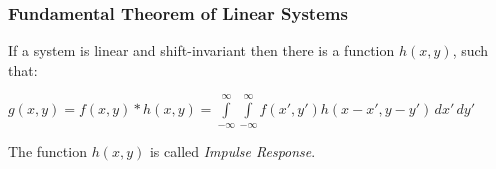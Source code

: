 







\begin{frame}
    \frametitle{Fundamental Theorem of Linear Systems}
    \begin{myDefinition}
        If a system is linear and shift-invariant then there is a function $h(x,y)$, such that:
        \begin{center}
            $g(x,y) = f(x,y) \ast h(x,y) = \int\limits_{-\infty}^{\infty}\int\limits_{-\infty}^{\infty} f(x',y')h(x-x',y-y') \, dx' \, dy'$
        \end{center}

        \vspace{5 mm}

        The function $h(x,y)$ is called \textit{Impulse Response}.
    \end{myDefinition}
\end{frame}


